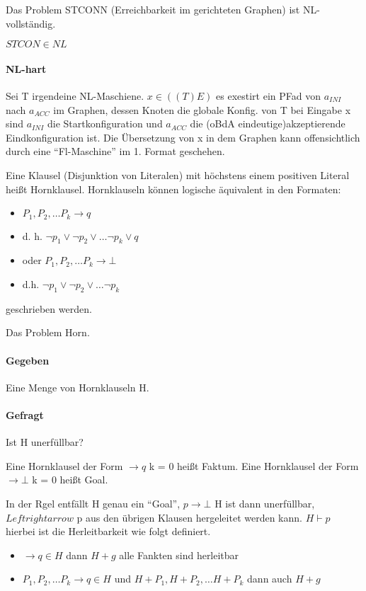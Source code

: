 \begin{satz}Das Problem STCONN (Erreichbarkeit im gerichteten Graphen) ist NL-vollständig.
\end{satz}

\begin{beweis}
$STCON \in NL$ \checkmark

\paragraph{NL-hart} Sei T irgendeine NL-Maschiene. $x \in ((T) E)$
es exestirt ein PFad von $a_{INI}$ nach $a_{ACC}$ im Graphen, dessen
Knoten die globale Konfig. von T bei Eingabe x sind $a_{INI}$ die
Startkonfiguration und $a_{ACC}$ die (oBdA eindeutige)akzeptierende Eindkonfiguration ist. Die Übersetzung von x in dem Graphen kann offensichtlich durch eine ``Fl-Maschine'' im 1. Format geschehen.
\end{beweis}

Eine Klausel (Disjunktion von Literalen) mit höchstens einem positiven
Literal heißt Hornklausel. Hornklauseln können logische äquivalent in
den Formaten:


\begin{itemize}
\item $P_1, P_2, \dots P_k \rightarrow q$ 
\item d. h. $\neg p_1 \lor \neg p_2 \lor \dots \neg p_k \lor q$

\item oder $P_1, P_2, \dots P_k \rightarrow \bot$
\item d.h. $\neg p_1 \lor \neg p_2 \lor \dots \neg p_k$
\end{itemize}
geschrieben werden.

Das Problem Horn.
\paragraph{Gegeben}
Eine Menge von Hornklauseln H.
\paragraph{Gefragt}
Ist H unerfüllbar?


Eine Hornklausel der Form $\rightarrow q$ k = 0 heißt Faktum.
Eine Hornklausel der Form $\rightarrow \bot$ k = 0 heißt Goal.

In der Rgel entfällt H genau ein ``Goal'', $p\rightarrow \bot$
H ist dann unerfüllbar, $Leftrightarrow$ p aus den übrigen Klausen hergeleitet werden kann. $H \vdash p$ hierbei ist die Herleitbarkeit wie folgt definiert.
\begin{itemize}
\item $\rightarrow q \in H$ dann $H+g$ alle Fankten sind herleitbar
\item $P_1, P_2, \dots P_k \rightarrow q \in H$ und
$H+P_1, H+P_2, \dots H+P_k$ dann auch $H+g$
\end{itemize}

